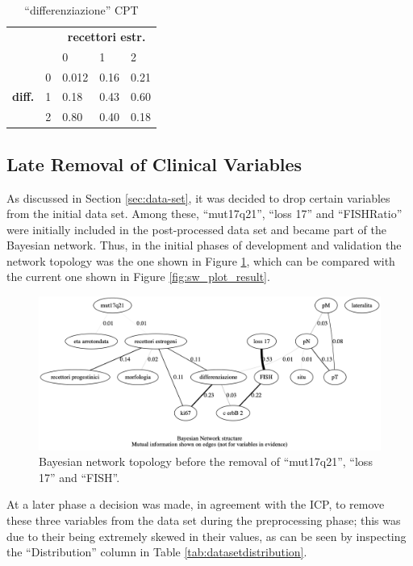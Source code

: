 \begin{table}[htbp]
\centering
\caption{\enquote{differenziazione} CPT}
\begin{tabularx}{0.5\textwidth}{ccXXX}
\toprule
      & &  \multicolumn{3}{c}{\textbf{recettori estr.}} \\
\cmidrule(lr){3-5}
 & & 0 & 1 & 2   \\ 
 \multirow{3}{*}{\textbf{diff.}}  & 0 & 0.012 & 0.16 & 0.21  \\
 & 1 & 0.18 & 0.43 & 0.60    \\
 & 2 & 0.80 & 0.40 & 0.18 \\
\bottomrule
\end{tabularx}
\label{tab:diff-cpd-issues}
\end{table}

\subsection{Late Removal of Clinical Variables} \label{subsec:removal-clinical-variables}
As discussed in Section \ref{sec:data-set}, it was decided to drop certain variables from the initial data set.
Among these, \enquote{mut17q21}, \enquote{loss 17} and \enquote{FISHRatio} were initially included in the post-processed data set and became part of the Bayesian network.
Thus, in the initial phases of development and validation the network topology was the one shown in Figure \ref{fig:old-bn-plot}, which can be compared with the current one shown in Figure \ref{fig:sw_plot_result}.

\begin{figure}[htbp]
\centerline{\includegraphics[width=\textwidth]{results/images/old-bn-plot}}
\caption{Bayesian network topology before the removal of \enquote{mut17q21}, \enquote{loss 17} and \enquote{FISH}.}
\label{fig:old-bn-plot}
\end{figure}

At a later phase a decision was made, in agreement with the ICP, to remove these three variables from the data set during the preprocessing phase; this was due to their being extremely skewed in their values, as can be seen by inspecting the \enquote{Distribution} column in Table \ref{tab:datasetdistribution}.

